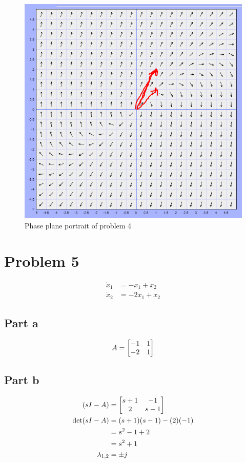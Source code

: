\documentclass[]{article}
\begin{document}
\begin{figure}[p]
	\centering
	\includegraphics[width=0.7\linewidth]{fig/pblm4_w_vectors}
	\caption{Phase plane portrait of problem 4}
	\label{fig:pblm4}
\end{figure}


\newpage
\section{Problem 5}
\begin{align*}
	\dot{x}_1 &= - x_1 + x_2\\
	\dot{x}_2 &= - 2 x_1 + x_2
\end{align*}

\subsection{Part a}
\begin{displaymath}
	A = \mqty[-1&1\\-2&1]
\end{displaymath}

\subsection{Part b}

\begin{align*}
	(sI - A)
	&= \mqty[s+1 & -1\\ 2 & s-1]\\
	\det(sI-A)
	&= (s+1)(s-1) - (2)(-1)\\
	&= s^2 -1 + 2\\
	&= s^2 + 1\\
	\lambda_{1,2}
	&= \pm j
\end{align*}
\end{document}
